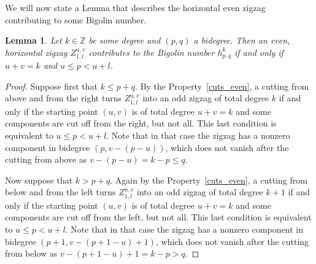 \documentclass[leqno]{article}
\newtheorem{Lemma}[equation]{Lemma}
\theoremstyle{definition}
\numberwithin{equation}{section}
\begin{document}
We will now state a Lemma that describes the horizontal even zigzag contributing to some Bigolin number.
\begin{Lemma}
\label{lemme2}
Let $k \in \mathbb{Z}$ be some degree and $(p, q)$ a bidegree. Then an even, horizontal zigzag $Z^{u, v}_{1, l}$ contributes to the Bigolin number $h^k_{p, q}$ if and only if $u + v = k$ and $u \leqslant p < u+l$. 
\end{Lemma}
\begin{proof}
Suppose first that $k \leqslant p+q$. By the Property~\ref{cuts_even}, a cutting from above and from the right turns $Z^{u, v}_{1, l}$ into an odd zigzag of total degree $k$ if and only if the starting point $(u, v)$ is of total degree $u+v=k$ and some components are cut off from the right, but not all. This last condition is equivalent to $u \leqslant p < u+l$. Note that in that case the zigzag has a nonzero component in bidegree $(p, v-(p-u))$, which does not vanish after the cutting from above as $v-(p-u) = k-p \leqslant q$.

Now suppose that $k > p+q$. Again by the Property~\ref{cuts_even}, a cutting from below and from the left turns $Z^{u, v}_{1, l}$ into an odd zigzag of total degree $k+1$ if and only if the starting point $(u, v)$ is of total degree $u+v=k$ and some components are cut off from the left, but not all. This last condition is equivalent to $u \leqslant p < u+l$. Note that in that case the zigzag has a nonzero component in bidegree $(p+1, v-(p+1-u)+1)$, which does not vanish after the cutting from below as $v-(p+1-u)+1=k-p>q$.
\end{proof}
\end{document}
